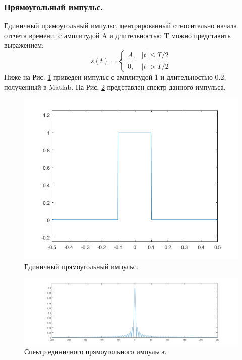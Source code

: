 \documentclass[a4paper,14pt]{extarticle}
\begin{document}
\subsubsection{Прямоугольный импульс.}
Единичный прямоугольный импульс, центрированный относительно начала отсчета времени, с амплитудой A и длительностью T можно представить выражением:
\begin{equation*}
s(t) = \begin{cases} A, & |t| \leq T/2 \\ 0, & |t| > T/2 \end{cases}
\end{equation*}
Ниже на Рис. \ref{rect} приведен импульс с амплитудой 1 и длительностью 0.2, полученный в Matlab. На Рис. \ref{rect_} представлен спектр данного импульса.
\begin{figure}[H]
\centering
\includegraphics[scale=0.75]{pics/1rect.png}
\caption{Единичный прямоугольный импульс.}
\label{rect}
\end{figure}

\begin{figure}[H]
\centering
\includegraphics[scale=0.5]{pics/1rect_spec.png}
\caption{Спектр единичного прямоугольного импульса.}
\label{rect_}
\end{figure}
\end{document}
